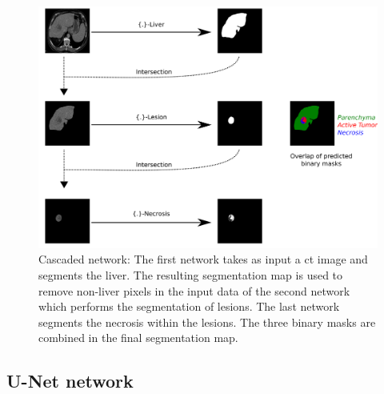 \begin{figure}[th!]
	\centering
	\includegraphics[width=0.7\linewidth]{../SemanticSeg/images/Cascade2}
	\caption{Cascaded network: The first network takes as input a \ac{ct} image and segments the liver. The resulting segmentation map is used to remove non-liver pixels in the input data of the second network which performs the segmentation of lesions. The last network segments the necrosis within the lesions. The three binary masks are combined in the final segmentation map.}
	\label{CARS_Cascade}
\end{figure}


\subsection{U-Net network}

